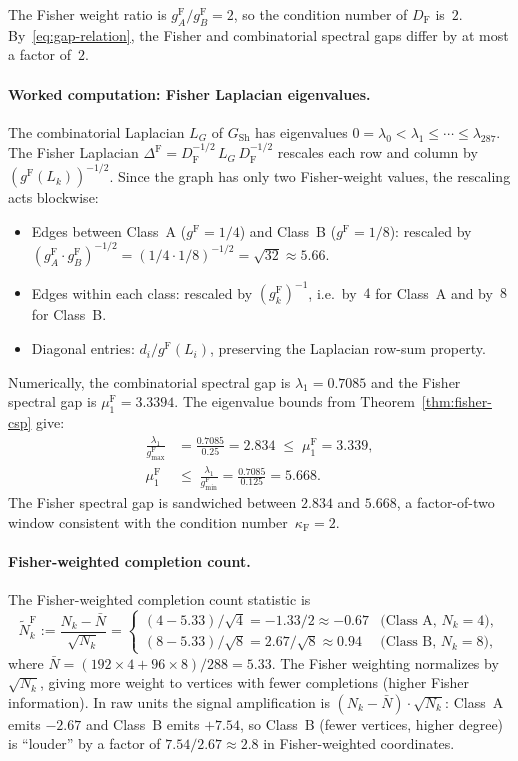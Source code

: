\documentclass[11pt]{article}
\newcommand{\gF}{g^{\mathrm{F}}}
\theoremstyle{remark}
\begin{document}
The Fisher weight ratio is $\gF_A / \gF_B = 2$, so the condition number of
$D_{\mathrm{F}}$ is~$2$.  By~\eqref{eq:gap-relation}, the Fisher and
combinatorial spectral gaps differ by at most a factor of~$2$.

\paragraph{Worked computation: Fisher Laplacian eigenvalues.}
The combinatorial Laplacian $L_G$ of $G_{\mathrm{Sh}}$ has eigenvalues
$0 = \lambda_0 < \lambda_1 \le \cdots \le \lambda_{287}$.  The Fisher Laplacian
$\Delta^{\mathrm{F}} = D_{\mathrm{F}}^{-1/2}\, L_G\, D_{\mathrm{F}}^{-1/2}$
rescales each row and column by $(\gF(L_k))^{-1/2}$.  Since the graph has
only two Fisher-weight values, the rescaling acts blockwise:
\begin{itemize}[leftmargin=*]
  \item Edges between Class~A ($\gF = 1/4$) and Class~B ($\gF = 1/8$):
  rescaled by
  $(\gF_A \cdot \gF_B)^{-1/2} = (1/4 \cdot 1/8)^{-1/2} = \sqrt{32}
  \approx 5.66$.
  \item Edges within each class: rescaled by $(\gF_k)^{-1}$, i.e.\ by~$4$
  for Class~A and by~$8$ for Class~B.
  \item Diagonal entries: $d_i / \gF(L_i)$, preserving the Laplacian
  row-sum property.
\end{itemize}

Numerically, the combinatorial spectral gap is $\lambda_1 = 0.7085$ and the
Fisher spectral gap is $\mu_1^{\mathrm{F}} = 3.3394$.  The eigenvalue bounds
from Theorem~\ref{thm:fisher-csp} give:
\begin{align*}
\frac{\lambda_1}{\gF_{\max}}
&= \frac{0.7085}{0.25}
= 2.834
\;\le\; \mu_1^{\mathrm{F}} = 3.339, \\
\mu_1^{\mathrm{F}}
&\le\; \frac{\lambda_1}{\gF_{\min}}
= \frac{0.7085}{0.125}
= 5.668.
\end{align*}
The Fisher spectral gap is sandwiched between $2.834$ and $5.668$, a
factor-of-two window consistent with the condition number~$\kappa_{\mathrm{F}} = 2$.

\paragraph{Fisher-weighted completion count.}
The Fisher-weighted completion count statistic is
\[
\tilde{N}_k^{\mathrm{F}} := \frac{N_k - \bar{N}}{\sqrt{N_k}}
= \begin{cases}
(4 - 5.33)/\sqrt{4} = -1.33/2 \approx -0.67 & \text{(Class A, $N_k = 4$)}, \\
(8 - 5.33)/\sqrt{8} = 2.67/\sqrt{8} \approx 0.94 & \text{(Class B, $N_k = 8$)},
\end{cases}
\]
where $\bar{N} = (192 \times 4 + 96 \times 8)/288 = 5.33$.  The Fisher
weighting normalizes by $\sqrt{N_k}$, giving
more weight to vertices with fewer completions (higher Fisher information).
In raw units the signal amplification is
$(N_k - \bar{N}) \cdot \sqrt{N_k}$: Class~A emits $-2.67$ and Class~B
emits $+7.54$, so Class~B (fewer vertices, higher degree) is ``louder'' by
a factor of $7.54/2.67 \approx 2.8$ in Fisher-weighted coordinates.
\end{document}
